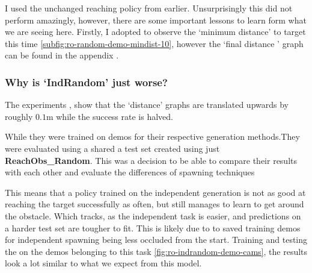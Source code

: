 I used the unchanged reaching policy from earlier. Unsurprisingly this did not perform amazingly, however, there are some important lessons to learn form what we are seeing here. Firstly, I adopted to observe the `minimum distance' to target this time \ref{subfig:ro-random-demo-mindist-10}, however the `final distance ' graph can be found in the appendix . 

\subsubsection{Why is `IndRandom' just worse?}
The experiments , show that the `distance' graphs are translated upwards by roughly $0.1$m while the success rate is halved.

While they were trained on demos for their respective generation methods.They were evaluated using a shared a test set created using just \textbf{ReachObs\_Random}. This was a decision to be able to compare their results with each other and evaluate the differences of spawning techniques

This means that a policy trained on the independent generation is not as good at reaching the target successfully as often, but still manages to learn to get around the obstacle. Which tracks, as the independent task is easier, and predictions on a harder test set are tougher to fit.
This is likely due to to saved training demos for independent spawning being less occluded from the start. Training and testing the on the demos belonging to this task \ref{fig:ro-indrandom-demo-cams}, the results look a lot similar to what we expect from this model.


